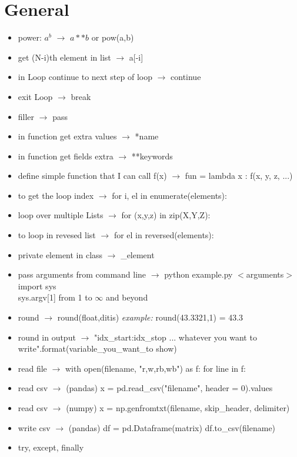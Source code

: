 \documentclass{article}
\begin{document}
\section{General}
\begin{itemize}
\item power: $a^{b}$ $\rightarrow$ $a**b$ or pow(a,b)
\item get (N-i)th element in list $\rightarrow$ a[-i]
\item in Loop continue to next step of loop $\rightarrow$ continue
\item exit Loop $\rightarrow$ break
\item filler $\rightarrow$ pass
\item in function get extra values $\rightarrow$ *name
\item in function get fields extra $\rightarrow$ **keywords
\item define simple function that I can call f(x) $\rightarrow$ fun = lambda x : f(x, y, z, ...)
\item to get the loop index $\rightarrow$ for i, el in enumerate(elements):
\item loop over multiple Lists $\rightarrow$ for (x,y,z) in zip(X,Y,Z):
\item to loop in revesed list $\rightarrow$ for  el in reversed(elements):
\item private element in class $\rightarrow$ \_element
\item pass arguments from command line $\rightarrow$ python example.py $<$arguments$>$      \\
                                                import sys \\
                                                sys.argv[1]  from 1 to $\infty$ and beyond
\item round $\rightarrow$ round(float,ditis) \textit{example:} round(43.3321,1) = 43.3
\item round in output $\rightarrow$ "{idx\_start:idx\_stop} ... whatever you want to write".format(variable\_you\_want\_to show)
\item read file $\rightarrow$ with open(filename, "r,w,rb,wb") as f:
                                for line in f:
\item read csv $\rightarrow$ (pandas) x = pd.read\_csv("filename", header = 0).values
\item read csv $\rightarrow$ (numpy) x = np.genfromtxt(filename, skip\_header, delimiter)
\item write csv $\rightarrow$ (pandas) df = pd.Dataframe(matrix)
                                    df.to\_csv(filename)
\item try, except, finally
\end{itemize}
\end{document}
